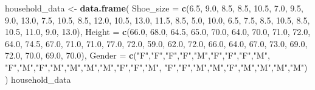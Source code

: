 \documentclass[
]{article}
\newenvironment{Shaded}{\begin{snugshade}}{\end{snugshade}}
\newcommand{\AttributeTok}[1]{\textcolor[rgb]{0.13,0.29,0.53}{#1}}
\newcommand{\FloatTok}[1]{\textcolor[rgb]{0.00,0.00,0.81}{#1}}
\newcommand{\FunctionTok}[1]{\textcolor[rgb]{0.13,0.29,0.53}{\textbf{#1}}}
\newcommand{\NormalTok}[1]{#1}
\newcommand{\OtherTok}[1]{\textcolor[rgb]{0.56,0.35,0.01}{#1}}
\newcommand{\StringTok}[1]{\textcolor[rgb]{0.31,0.60,0.02}{#1}}
\begin{document}
\begin{Shaded}
\begin{Highlighting}[]
\NormalTok{household\_data }\OtherTok{\textless{}{-}} \FunctionTok{data.frame}\NormalTok{(}
  \AttributeTok{Shoe\_size =} \FunctionTok{c}\NormalTok{(}\FloatTok{6.5}\NormalTok{, }\FloatTok{9.0}\NormalTok{, }\FloatTok{8.5}\NormalTok{, }\FloatTok{8.5}\NormalTok{, }\FloatTok{10.5}\NormalTok{, }\FloatTok{7.0}\NormalTok{, }\FloatTok{9.5}\NormalTok{, }\FloatTok{9.0}\NormalTok{, }\FloatTok{13.0}\NormalTok{, }\FloatTok{7.5}\NormalTok{, }\FloatTok{10.5}\NormalTok{, }\FloatTok{8.5}\NormalTok{, }\FloatTok{12.0}\NormalTok{, }\FloatTok{10.5}\NormalTok{,}
\FloatTok{13.0}\NormalTok{, }\FloatTok{11.5}\NormalTok{, }\FloatTok{8.5}\NormalTok{, }\FloatTok{5.0}\NormalTok{, }\FloatTok{10.0}\NormalTok{, }\FloatTok{6.5}\NormalTok{, }\FloatTok{7.5}\NormalTok{, }
\FloatTok{8.5}\NormalTok{, }\FloatTok{10.5}\NormalTok{, }\FloatTok{8.5}\NormalTok{, }\FloatTok{10.5}\NormalTok{, }\FloatTok{11.0}\NormalTok{, }\FloatTok{9.0}\NormalTok{, }\FloatTok{13.0}\NormalTok{), }
  \AttributeTok{Height =} \FunctionTok{c}\NormalTok{(}\FloatTok{66.0}\NormalTok{, }\FloatTok{68.0}\NormalTok{, }\FloatTok{64.5}\NormalTok{, }\FloatTok{65.0}\NormalTok{, }\FloatTok{70.0}\NormalTok{, }\FloatTok{64.0}\NormalTok{, }\FloatTok{70.0}\NormalTok{, }\FloatTok{71.0}\NormalTok{, }\FloatTok{72.0}\NormalTok{, }\FloatTok{64.0}\NormalTok{, }\FloatTok{74.5}\NormalTok{, }\FloatTok{67.0}\NormalTok{, }\FloatTok{71.0}\NormalTok{, }\FloatTok{71.0}\NormalTok{, }
\FloatTok{77.0}\NormalTok{, }\FloatTok{72.0}\NormalTok{, }\FloatTok{59.0}\NormalTok{, }\FloatTok{62.0}\NormalTok{, }\FloatTok{72.0}\NormalTok{, }\FloatTok{66.0}\NormalTok{, }\FloatTok{64.0}\NormalTok{, }
\FloatTok{67.0}\NormalTok{, }\FloatTok{73.0}\NormalTok{, }\FloatTok{69.0}\NormalTok{, }\FloatTok{72.0}\NormalTok{, }\FloatTok{70.0}\NormalTok{, }\FloatTok{69.0}\NormalTok{, }\FloatTok{70.0}\NormalTok{),}
  \AttributeTok{Gender =} \FunctionTok{c}\NormalTok{(}\StringTok{"F"}\NormalTok{,}\StringTok{"F"}\NormalTok{,}\StringTok{"F"}\NormalTok{,}\StringTok{"F"}\NormalTok{,}\StringTok{"M"}\NormalTok{,}\StringTok{"F"}\NormalTok{,}\StringTok{"F"}\NormalTok{,}\StringTok{"F"}\NormalTok{,}\StringTok{"M"}\NormalTok{,}
\StringTok{"F"}\NormalTok{,}\StringTok{"M"}\NormalTok{,}\StringTok{"F"}\NormalTok{,}\StringTok{"M"}\NormalTok{,}\StringTok{"M"}\NormalTok{,}\StringTok{"M"}\NormalTok{,}\StringTok{"M"}\NormalTok{,}\StringTok{"F"}\NormalTok{,}\StringTok{"F"}\NormalTok{,}\StringTok{"M"}\NormalTok{,}
\StringTok{"F"}\NormalTok{,}\StringTok{"F"}\NormalTok{,}\StringTok{"M"}\NormalTok{,}\StringTok{"M"}\NormalTok{,}\StringTok{"F"}\NormalTok{,}\StringTok{"M"}\NormalTok{,}\StringTok{"M"}\NormalTok{,}\StringTok{"M"}\NormalTok{,}\StringTok{"M"}\NormalTok{)}
\NormalTok{)}
\NormalTok{household\_data}
\end{Highlighting}
\end{Shaded}
\end{document}
